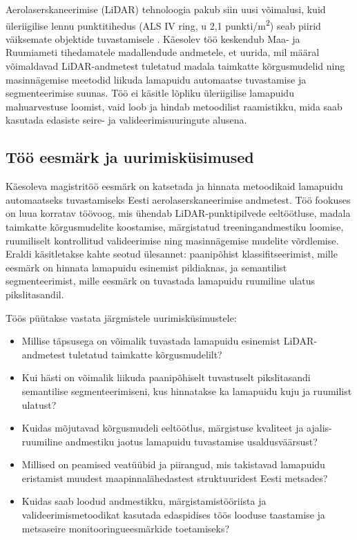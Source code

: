 Aerolaserskaneerimise (LiDAR) tehnoloogia pakub siin uusi võimalusi, kuid üleriigilise lennu punktitihedus (ALS IV ring, u 2,1 punkti/m\textsuperscript{2}) seab piirid väiksemate objektide tuvastamisele \parencite{maa-_ja_ruumiamet_als_nodate}. Käesolev töö keskendub Maa- ja Ruumiameti tihedamatele madallendude andmetele, et uurida, mil määral võimaldavad LiDAR-andmetest tuletatud madala taimkatte kõrgusmudelid ning masinnägemise meetodid liikuda lamapuidu automaatse tuvastamise ja segmenteerimise suunas. Töö ei käsitle lõpliku üleriigilise lamapuidu mahuarvestuse loomist, vaid loob ja hindab metoodilist raamistikku, mida saab kasutada edasiste seire- ja valideerimisuuringute alusena.

\subsection{Töö eesmärk ja uurimisküsimused}

Käesoleva magistritöö eesmärk on katsetada ja hinnata metoodikaid lamapuidu automaatseks tuvastamiseks Eesti aerolaserskaneerimise andmetest. Töö fookuses on luua korratav töövoog, mis ühendab LiDAR-punktipilvede eeltöötluse, madala taimkatte kõrgusmudelite koostamise, märgistatud treeningandmestiku loomise, ruumiliselt kontrollitud valideerimise ning masinnägemise mudelite võrdlemise. Eraldi käsitletakse kahte seotud ülesannet: paanipõhist klassifitseerimist, mille eesmärk on hinnata lamapuidu esinemist pildiaknas, ja semantilist segmenteerimist, mille eesmärk on tuvastada lamapuidu ruumiline ulatus pikslitasandil.

Töös püütakse vastata järgmistele uurimisküsimustele:
\begin{itemize}
    \item Millise täpsusega on võimalik tuvastada lamapuidu esinemist LiDAR-andmetest tuletatud taimkatte kõrgusmudelilt?
    \item Kui hästi on võimalik liikuda paanipõhiselt tuvastuselt pikslitasandi semantilise segmenteerimiseni, kus hinnatakse ka lamapuidu kuju ja ruumilist ulatust?
    \item Kuidas mõjutavad kõrgusmudeli eeltöötlus, märgistuse kvaliteet ja ajalis-ruumiline andmestiku jaotus lamapuidu tuvastamise usaldusväärsust?
    \item Millised on peamised veatüübid ja piirangud, mis takistavad lamapuidu eristamist muudest maapinnalähedastest struktuuridest Eesti metsades?
    \item Kuidas saab loodud andmestikku, märgistamistööriista ja valideerimismetoodikat kasutada edaspidises töös looduse taastamise ja metsaseire monitooringueesmärkide toetamiseks?
\end{itemize}

